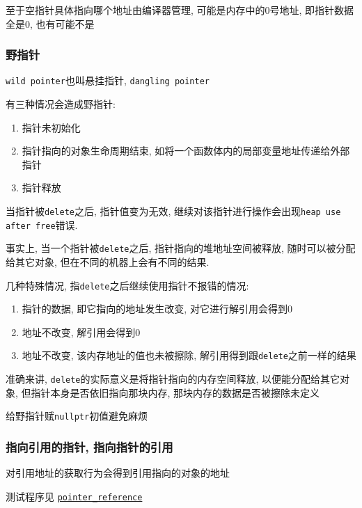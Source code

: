 至于空指针具体指向哪个地址由编译器管理, 可能是内存中的0号地址, 即指针数据全是0, 也有可能不是


\subsubsection{野指针}

{\tt wild pointer}也叫悬挂指针, {\tt dangling pointer}

有三种情况会造成野指针:
\begin{enumerate}
	\item 指针未初始化
	\item 指针指向的对象生命周期结束, 如将一个函数体内的局部变量地址传递给外部指针
	\item 指针释放
\end{enumerate}

当指针被{\tt delete}之后, 指针值变为无效, 继续对该指针进行操作会出现{\tt heap use after free}错误.

事实上, 当一个指针被{\tt delete}之后, 指针指向的堆地址空间被释放, 随时可以被分配给其它对象, 但在不同的机器上会有不同的结果.

\noindent 几种特殊情况, 指{\tt delete}之后继续使用指针不报错的情况:
\begin{enumerate}
	\item 指针的数据, 即它指向的地址发生改变, 对它进行解引用会得到0
	\item 地址不改变, 解引用会得到0
	\item 地址不改变, 该内存地址的值也未被擦除, 解引用得到跟{\tt delete}之前一样的结果
\end{enumerate}

准确来讲, {\tt delete}的实际意义是将指针指向的内存空间释放, 以便能分配给其它对象, 但指针本身是否依旧指向那块内存, 
	那块内存的数据是否被擦除未定义

给野指针赋{\tt nullptr}初值避免麻烦

\subsubsection{指向引用的指针, 指向指针的引用}
对引用地址的获取行为会得到引用指向的对象的地址

测试程序见 \href{https://github.com/wenqingqian/Obtuse/blob/main/test/cpp/basic/pointer_reference.cpp}{\tt pointer\_reference}




